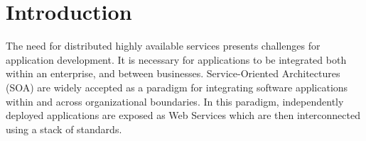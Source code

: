 \documentclass{llncs}
\begin{document}

%
%



\section{Introduction}
\label{sect:introduction}

The need for distributed highly available services presents challenges for application development.
It is necessary for applications to be integrated both within an enterprise, and between businesses.
Service-Oriented Architectures (SOA) are widely accepted as a paradigm for integrating software applications within and across organizational boundaries.
In this paradigm, independently deployed applications are exposed as Web Services which are then 
interconnected using a stack of standards. %
		
\end{document}
